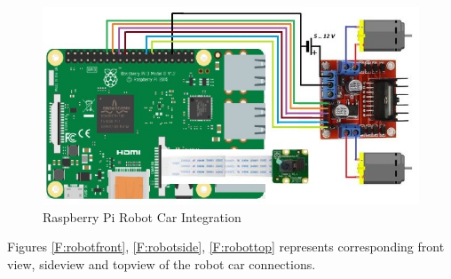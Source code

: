 \documentclass[sigconf]{acmart}
\begin{document}
\begin{figure}[htb]
  \includegraphics[width=1.0\columnwidth]{images/RaspPi_Robot.jpg}
  \caption{Raspberry Pi Robot Car Integration}\label{F:circuit}
\end{figure}

Figures \ref{F:robotfront}, \ref{F:robotside}, \ref{F:robottop}  represents corresponding 
front view, sideview and topview of the robot car connections.
\end{document}
